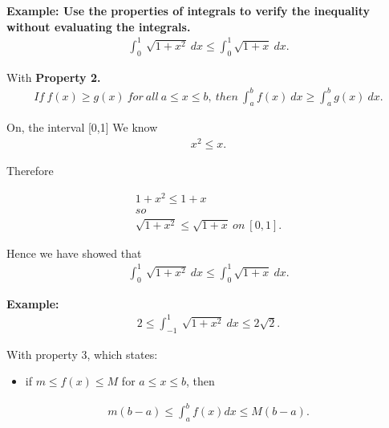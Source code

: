 \documentclass{report}
\begin{document}
\bigbreak \noindent 
\begin{mdframed}
  \textbf{Example: Use the properties of integrals to verify the inequality without evaluating the integrals.}
  \begin{align*}
    \int_{0}^{1}\ \sqrt{1+x^{2}}\ dx \leq \int_{0}^{1}\sqrt{1+x}\ dx
  .\end{align*}
\end{mdframed}

\bigbreak \noindent 
With \textbf{Property 2.}
\begin{align*}
  If\ f(x) \geq g(x)\ for\ all\ a \leq x \leq b,\ then\ \int_{a}^{b}f(x)\ dx \geq \int_{a}^{b}g(x)\ dx 
.\end{align*}

\bigbreak \noindent  \bigbreak \noindent 
On, the interval [0,1] We know
\begin{align*}
  x^{2} \leq x 
.\end{align*}

\bigbreak \noindent \bigbreak \noindent 
Therefore

\begin{align*}
  1+x^{2} \leq 1+ x \\
  so \\
  \sqrt{1+x^{2}} \leq \sqrt{1+x}\ on\ [0,1]
.\end{align*}

\bigbreak \noindent \bigbreak \noindent
Hence we have showed that 
\begin{align*}
  \int_{0}^{1}\ \sqrt{1+x^{2}}\ dx \leq \int_{0}^{1}\sqrt{1+x}\ dx 
.\end{align*}

\pagebreak \bigbreak \noindent
\bigbreak \noindent 
\begin{mdframed}
  \textbf{Example: }
  \begin{align*}
    2 \leq \int_{-1}^{1}\ \sqrt{1+x^{2}}\ dx \leq 2\sqrt{2}
  .\end{align*}
\end{mdframed}

\bigbreak \noindent \bigbreak \noindent
With property 3, which states:

\bigbreak \noindent \bigbreak \noindent
\begin{itemize}
  \item if $m \leq f(x) \leq M$ for $a \leq x \leq b$, then
\end{itemize}
\begin{align*}
  m(b-a) \leq \int_{a}^{b}f(x)dx \leq M(b-a)
.\end{align*}
\end{document}

